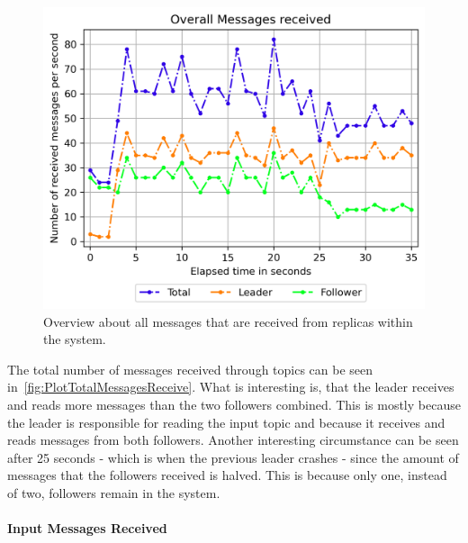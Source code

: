 \begin{figure}[!hb]
	\centering
	\includegraphics[width=0.75\linewidth]{images/plots/TotalMessagesReceive}
	\caption{Overview about all messages that are received from replicas within the system.}
	\label{fig:PlotTotalMessagesReceive}
\end{figure}

The total number of messages received through  topics can be seen in~\autoref{fig:PlotTotalMessagesReceive}.
What is interesting is, that the leader receives and reads more messages than the two followers combined.
This is mostly because the leader is responsible for reading the input topic and because it receives and reads messages from both followers.
Another interesting circumstance can be seen after 25 seconds - which is when the previous leader crashes - since the amount of messages that the followers received is halved.
This is because only one, instead of two, followers remain in the system.

\paragraph{Input Messages Received}

